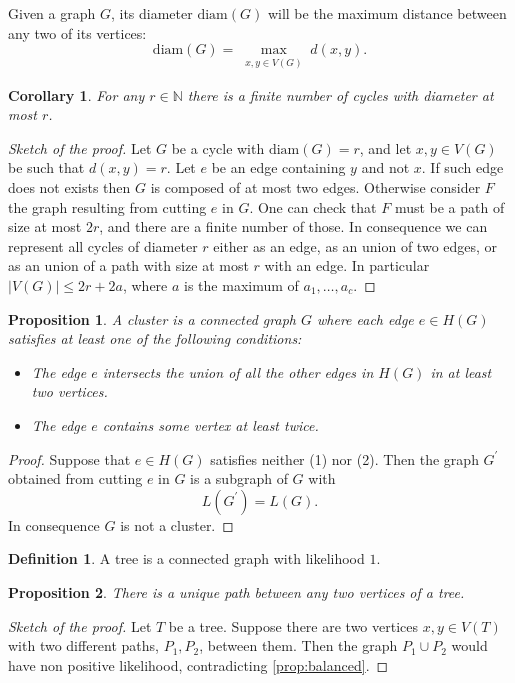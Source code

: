 \documentclass[11pt,notitlepage,a4paper]{article}
\newtheorem{proposition}{Proposition}[section]
\newtheorem{corollary}{Corollary}[section]
\theoremstyle{definition}
\newtheorem{definition}{Definition}[section]
\newcommand{\N}{\mathbb{N}}
\begin{document}
Given a graph $G$, its diameter $\mathrm{diam}(G)$ will be the maximum distance
between any two of its vertices:
\[\mathrm{diam}(G)=\max_{\substack{x,y\in V(G)}} d(x,y).\]

\begin{corollary}\label{cor:finitecycles}
	For any $r\in \N$ there is a finite number of 
	cycles with diameter at most $r$.
\end{corollary}
\begin{proof}[Sketch of the proof]
	Let $G$ be a cycle with $\mathrm{diam}(G)=r$, and let
	$x,y\in V(G)$ be such that $d(x,y)=r$. Let $e$
	be an edge containing $y$ and not $x$. If such edge
	does not exists then $G$ is composed of at most two edges.
	Otherwise
	consider $F$ the graph resulting from cutting $e$ in $G$. 
	One can check that $F$ must be a path of size at most $2r$, 
	and there are a finite number of those.
	In consequence we can represent all cycles of diameter $r$
	either as an edge, as an union of two edges, or as an
	union of a path with size at most $r$ with an edge. 
	In particular $|V(G)|\leq 2r+2a$, where $a$ is the
	maximum of $a_1,\dots, a_c$.
\end{proof}


\begin{proposition}
	A cluster is a connected graph $G$ where each edge
	$e\in H(G)$
	satisfies at least one of the following conditions:
	\begin{itemize}
		\item[(1)] The edge $e$ intersects the union of all the other edges
		in $H(G)$ in at least two vertices.
		 \item[(2)] The edge $e$ contains some vertex at least twice.
	\end{itemize}
\end{proposition}
\begin{proof}
	Suppose that $e\in H(G)$ satisfies neither (1) nor (2). Then
	the graph $G^\prime$ obtained from cutting $e$ in $G$ is a subgraph
	of $G$ with
	\[L(G^\prime)= L(G).\]
	In consequence $G$ is not a cluster. 
\end{proof}

\begin{definition} 
	A tree is a connected graph with likelihood $1$.
\end{definition}

\begin{proposition} There is a unique path between any two vertices of a tree. 
\end{proposition}
\begin{proof}[Sketch of the proof]
	Let $T$ be a tree. Suppose there are 
	two vertices $x, y\in V(T)$
	with two different paths, $P_1,P_2$, between them. 
	Then the graph $P_1\cup P_2$ would have non positive
	likelihood, contradicting \cref{prop:balanced}.
\end{proof}
\end{document}
